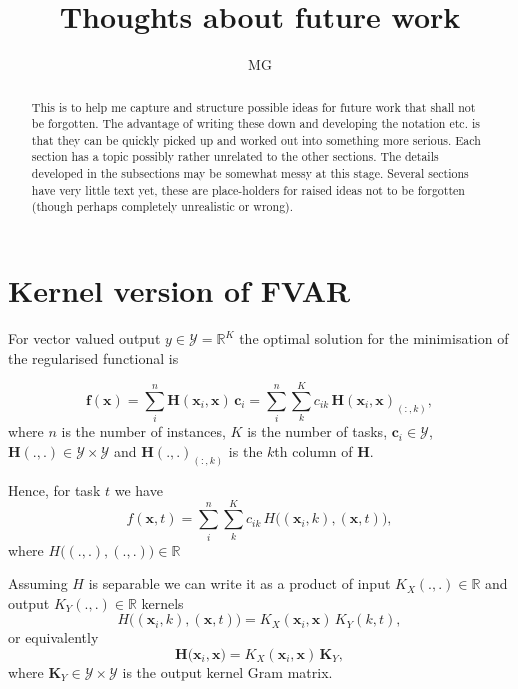 \documentclass[a4paper]{article}
\newcommand{\vc}[1]{\mathbf{#1}}
\begin{document}
\title{Thoughts about future work}
\author{MG}
\maketitle

\setlength{\parindent}{0pt}
\setlength{\parskip}{1ex plus 0.5ex minus 0.2ex}

\begin{abstract}
This is to help me capture and structure possible ideas for future work that shall not be forgotten. The advantage of writing these down and developing the notation etc. is that they can be quickly picked up and worked out into something more serious. Each section has a topic possibly rather unrelated to the other sections. The details developed in the subsections may be somewhat messy at this stage. Several sections have very little text yet, these are place-holders for raised ideas not to be forgotten (though perhaps completely unrealistic or wrong).
\end{abstract}

\tableofcontents

\section{Kernel version of FVAR}

For vector valued output $y \in \mathcal{Y} = \mathbb{R}^K$ the optimal solution for the minimisation of the regularised functional is

\begin{equation}
\vc{f}(\vc{x})
 =  \sum_i^n \vc{H}(\vc{x}_i,\vc{x}) \, \vc{c}_i = 
\sum_i^n \sum_k^K c_{ik} \, \vc{H}(\vc{x}_i,\vc{x})_{(:,k)},
\end{equation}
where $n$ is the number of instances, $K$ is the number of tasks, $\vc{c}_i \in \mathcal{Y}$, $\vc{H}(.,.) \in \mathcal{Y} \times \mathcal{Y}$ and $\vc{H}(.,.)_{(:,k)}$ is the $k$th column of $\vc{H}$.

Hence, for task $t$ we have
\begin{equation}
f(\vc{x},t) = \sum_i^n \sum_k^K c_{ik} \, H\big((\vc{x}_i,k),(\vc{x},t)\big),
\end{equation}
where $H\big((.,.),(.,.)\big) \in \mathbb{R}$

Assuming $H$ is separable we can write it as a product of input $K_X(.,.) \in \mathbb{R}$ and output $K_Y(.,.) \in \mathbb{R}$ kernels
\begin{equation}
H\big((\vc{x}_i,k),(\vc{x},t)\big) = K_X(\vc{x}_i,\vc{x}) \, K_Y(k,t),
\end{equation}
or equivalently
\begin{equation}
\vc{H}\big(\vc{x}_i,\vc{x}) = K_X(\vc{x}_i,\vc{x}) \, \vc{K}_Y,
\end{equation}
where $\vc{K}_Y \in \mathcal{Y} \times \mathcal{Y}$ is the output kernel Gram matrix.
\end{document}
